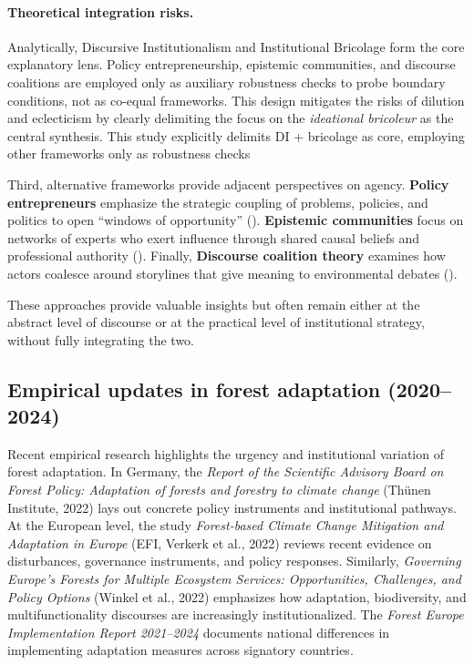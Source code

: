 \paragraph{Theoretical integration risks.}
Analytically, Discursive Institutionalism and Institutional Bricolage form the core 
explanatory lens. Policy entrepreneurship, epistemic communities, and discourse 
coalitions are employed only as auxiliary robustness checks to probe boundary 
conditions, not as co-equal frameworks. This design mitigates the risks of dilution 
and eclecticism by clearly delimiting the focus on the \textit{ideational bricoleur} 
as the central synthesis. This study explicitly delimits DI + bricolage as core,
employing other frameworks only as robustness checks


Third, alternative frameworks provide adjacent perspectives on agency. 
\textbf{Policy entrepreneurs} emphasize the strategic coupling of problems, 
policies, and politics to open ``windows of opportunity'' 
(\cite{Kingdon1995,MintromNorman2009}). 
\textbf{Epistemic communities} focus on networks of experts who exert influence 
through shared causal beliefs and professional authority (\cite{Haas1992}). 
Finally, \textbf{Discourse coalition theory} examines how actors coalesce around 
storylines that give meaning to environmental debates (\cite{Hajer1995,ArtsBuizer2009}). 

These approaches provide valuable insights but often remain either at the abstract level 
of discourse or at the practical level of institutional strategy, without fully 
integrating the two.



\subsection*{Empirical updates in forest adaptation (2020--2024)}

Recent empirical research highlights the urgency and institutional variation of forest adaptation.  
In Germany, the \textit{Report of the Scientific Advisory Board on Forest Policy: 
Adaptation of forests and forestry to climate change} (Thünen Institute, 2022) 
lays out concrete policy instruments and institutional pathways.  
At the European level, the study \textit{Forest-based Climate Change Mitigation 
and Adaptation in Europe} (EFI, Verkerk et al., 2022) reviews recent evidence 
on disturbances, governance instruments, and policy responses.  
Similarly, \textit{Governing Europe’s Forests for Multiple Ecosystem Services: 
Opportunities, Challenges, and Policy Options} (Winkel et al., 2022) emphasizes
 how adaptation, biodiversity, and multifunctionality discourses are increasingly institutionalized.  
The \textit{Forest Europe Implementation Report 2021--2024} documents national 
differences in implementing adaptation measures across signatory countries.  


